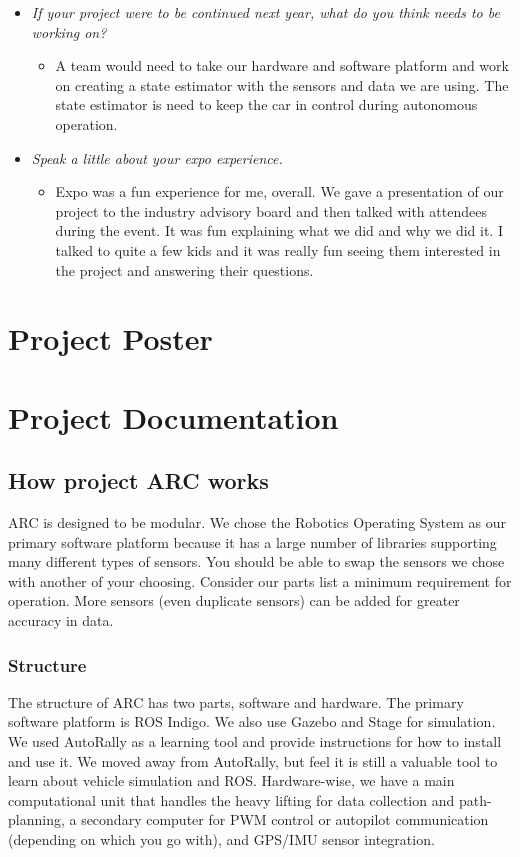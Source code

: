 \documentclass[compsoc,draftclsnofoot,onecolumn,10pt]{IEEEtran}
\begin{document}
\begin{itemize}
    \item \textit{If your project were to be continued next year, what do you think needs to be working on?}
    \begin{itemize}
        \item A team would need to take our hardware and software platform and work on creating a state estimator with the sensors and data we are using. The state estimator is need to keep the car in control during autonomous operation.
    \end{itemize}

    \item \textit{Speak a little about your expo experience.}
    \begin{itemize}
        \item Expo was a fun experience for me, overall. We gave a presentation of our project to the industry advisory board and then talked with attendees during the event. It was fun explaining what we did and why we did it. I talked to quite a few kids and it was really fun seeing them interested in the project and answering their questions.
    \end{itemize}
\end{itemize}

\section{Project Poster}

\section{Project Documentation}

    \subsection{How project ARC works}
    ARC is designed to be modular. We chose the Robotics Operating System as our primary software platform because it has a large number of libraries supporting many different types of sensors. You should be able to swap the sensors we chose with another of your choosing. Consider our parts list a minimum requirement for operation. More sensors (even duplicate sensors) can be added for greater accuracy in data.
        \subsubsection{Structure}
        The structure of ARC has two parts, software and hardware. The primary software platform is ROS Indigo. We also use Gazebo and Stage for simulation. We used AutoRally as a learning tool and provide instructions for how to install and use it. We moved away from AutoRally, but feel it is still a valuable tool to learn about vehicle simulation and ROS. Hardware-wise, we have a main computational unit that handles the heavy lifting for data collection and path-planning, a secondary computer for PWM control or autopilot communication (depending on which you go with), and GPS/IMU sensor integration.\\
        
\end{document}
